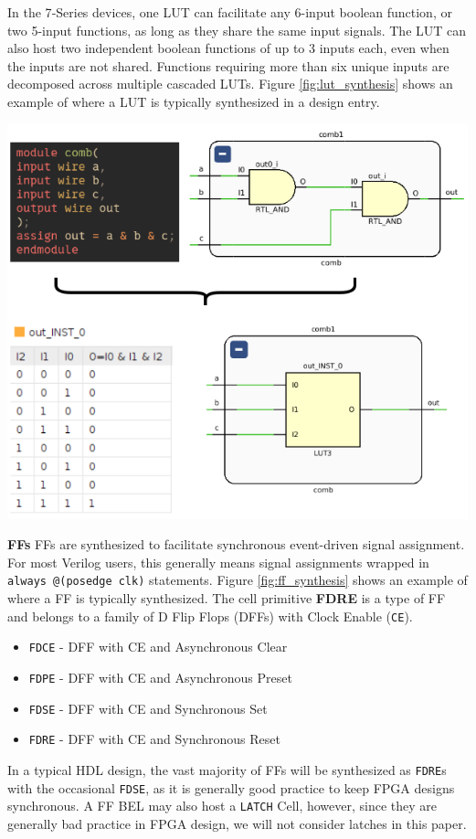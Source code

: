 \begin{multicols}{2}
In the 7‑Series devices, one LUT can facilitate any 6-input boolean function, or two 5-input functions, as long as they share the same input signals.  
The LUT can also host two independent boolean functions of up to 3 inputs each, even when the inputs are not shared.  
Functions requiring more than six unique inputs are decomposed across multiple cascaded LUTs.
Figure \ref{fig:lut_synthesis} shows an example of where a LUT is typically synthesized in a design entry. 

{
    \centering
    \includegraphics[width=\columnwidth]{figures/lut_synthesis.png}
    \label{fig:lut_synthesis}
}
\vspace{1.0cm}


\textbf{FFs} \quad
FFs are synthesized to facilitate synchronous event-driven signal assignment. 
For most Verilog users, this generally means signal assignments wrapped in \texttt{always @(posedge clk)} statements. 
Figure \ref{fig:ff_synthesis} shows an example of where a FF is typically synthesized. 
The cell primitive \textbf{FDRE} is a type of FF and belongs to a family of D Flip Flops (DFFs) with Clock Enable (\texttt{CE}). 
\begin{itemize}
\item \texttt{FDCE} - DFF with CE and Asynchronous Clear
\item \texttt{FDPE} - DFF with CE and Asynchronous Preset
\item \texttt{FDSE} - DFF with CE and Synchronous Set
\item \texttt{FDRE} - DFF with CE and Synchronous Reset
\end{itemize}
In a typical HDL design, the vast majority of FFs will be synthesized as \texttt{FDRE}s with the occasional \texttt{FDSE}, as it is generally good practice to keep FPGA designs synchronous. 
A FF BEL may also host a \texttt{LATCH} Cell, however, since they are generally bad practice in FPGA design, we will not consider latches in this paper. 


\end{multicols}

